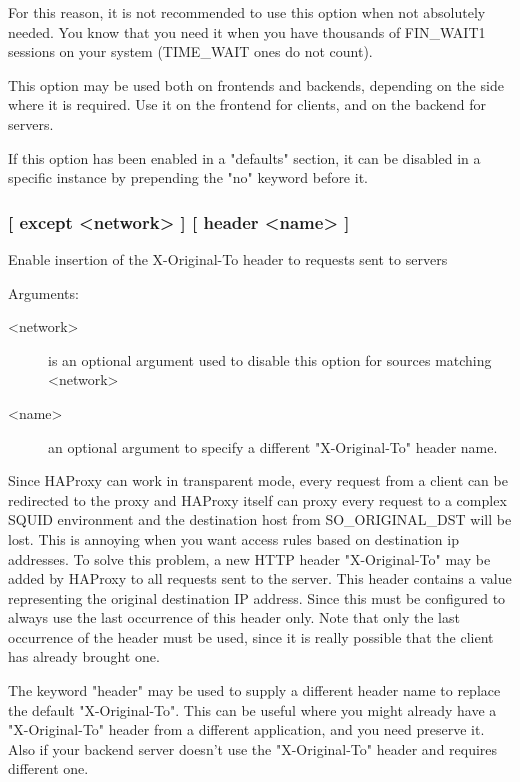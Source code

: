   For this reason, it is not recommended to use this option when not absolutely
  needed. You know that you need it when you have thousands of FIN\_WAIT1
  sessions on your system (TIME\_WAIT ones do not count).

  This option may be used both on frontends and backends, depending on the side
  where it is required. Use it on the frontend for clients, and on the backend
  for servers.

  If this option has been enabled in a "defaults" section, it can be disabled
  in a specific instance by prepending the "no" keyword before it.

\subsubsection[originalto]{ [ except <network> ] [ header <name> ]}


  Enable insertion of the X-Original-To header to requests sent to servers


  Arguments:
\begin{description}
\item[<network>] is an optional argument used to disable this option for sources
              matching <network>
\item[<name>] an optional argument to specify a different "X-Original-To"
              header name.
\end{description}

  Since HAProxy can work in transparent mode, every request from a client can
  be redirected to the proxy and HAProxy itself can proxy every request to a
  complex SQUID environment and the destination host from SO\_ORIGINAL\_DST will
  be lost. This is annoying when you want access rules based on destination ip
  addresses. To solve this problem, a new HTTP header "X-Original-To" may be
  added by HAProxy to all requests sent to the server. This header contains a
  value representing the original destination IP address. Since this must be
  configured to always use the last occurrence of this header only. Note that
  only the last occurrence of the header must be used, since it is really
  possible that the client has already brought one.

  The keyword "header" may be used to supply a different header name to replace
  the default "X-Original-To". This can be useful where you might already
  have a "X-Original-To" header from a different application, and you need
  preserve it. Also if your backend server doesn't use the "X-Original-To"
  header and requires different one.

